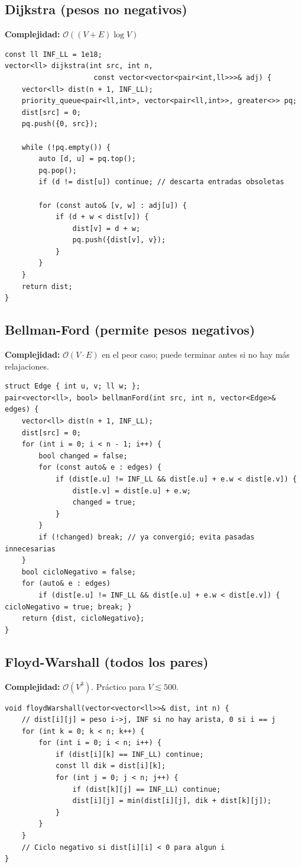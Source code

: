 \documentclass[10pt,twocolumn,letterpaper]{report}
\begin{document}
\subsection{Dijkstra (pesos no negativos)}
\textbf{Complejidad:} $\mathcal{O}((V + E) \log V)$
\begin{lstlisting}
const ll INF_LL = 1e18;
vector<ll> dijkstra(int src, int n,
                     const vector<vector<pair<int,ll>>>& adj) {
    vector<ll> dist(n + 1, INF_LL);
    priority_queue<pair<ll,int>, vector<pair<ll,int>>, greater<>> pq;
    dist[src] = 0;
    pq.push({0, src});

    while (!pq.empty()) {
        auto [d, u] = pq.top();
        pq.pop();
        if (d != dist[u]) continue; // descarta entradas obsoletas

        for (const auto& [v, w] : adj[u]) {
            if (d + w < dist[v]) {
                dist[v] = d + w;
                pq.push({dist[v], v});
            }
        }
    }
    return dist;
}
\end{lstlisting}

\subsection{Bellman-Ford (permite pesos negativos)}
\textbf{Complejidad:} $\mathcal{O}(V \cdot E)$ en el peor caso; puede terminar antes si no hay más relajaciones.
\begin{lstlisting}
struct Edge { int u, v; ll w; };
pair<vector<ll>, bool> bellmanFord(int src, int n, vector<Edge>& edges) {
    vector<ll> dist(n + 1, INF_LL);
    dist[src] = 0;
    for (int i = 0; i < n - 1; i++) {
        bool changed = false;
        for (const auto& e : edges) {
            if (dist[e.u] != INF_LL && dist[e.u] + e.w < dist[e.v]) {
                dist[e.v] = dist[e.u] + e.w;
                changed = true;
            }
        }
        if (!changed) break; // ya convergió; evita pasadas innecesarias
    }
    bool cicloNegativo = false;
    for (auto& e : edges)
        if (dist[e.u] != INF_LL && dist[e.u] + e.w < dist[e.v]) { cicloNegativo = true; break; }
    return {dist, cicloNegativo};
}
\end{lstlisting}

\subsection{Floyd-Warshall (todos los pares)}
\textbf{Complejidad:} $\mathcal{O}(V^3)$. Práctico para $V \lesssim 500$.
\begin{lstlisting}
void floydWarshall(vector<vector<ll>>& dist, int n) {
    // dist[i][j] = peso i->j, INF si no hay arista, 0 si i == j
    for (int k = 0; k < n; k++) {
        for (int i = 0; i < n; i++) {
            if (dist[i][k] == INF_LL) continue;
            const ll dik = dist[i][k];
            for (int j = 0; j < n; j++) {
                if (dist[k][j] == INF_LL) continue;
                dist[i][j] = min(dist[i][j], dik + dist[k][j]);
            }
        }
    }
    // Ciclo negativo si dist[i][i] < 0 para algun i
}
\end{lstlisting}
\end{document}
